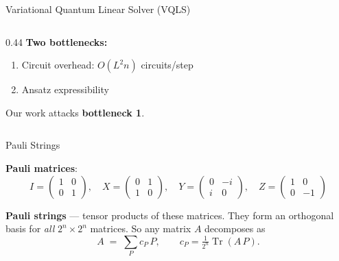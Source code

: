 \documentclass{beamer}
\begin{document}
\begin{frame}{Variational Quantum Linear Solver (VQLS)}
\begin{columns}
\begin{column}{0.44\textwidth}
      \vspace{4pt}
      \textbf{Two bottlenecks:}
      \begin{enumerate}
        \item Circuit overhead: $O(L^2 n)$ circuits/step
        \item Ansatz expressibility
      \end{enumerate}
      \smallskip
      Our work attacks \textbf{bottleneck 1}.
    \end{column}
  \end{columns}
\end{frame}

\begin{frame}{Pauli Strings}

  \textbf{Pauli matrices}:
  \[
    I = \begin{pmatrix}1&0\\0&1\end{pmatrix},\quad
    X = \begin{pmatrix}0&1\\1&0\end{pmatrix},\quad
    Y = \begin{pmatrix}0&-i\\i&0\end{pmatrix},\quad
    Z = \begin{pmatrix}1&0\\0&-1\end{pmatrix}
  \]

  \textbf{Pauli strings} — tensor products of these matrices. They form an orthogonal basis for
  \emph{all} $2^n\times 2^n$ matrices. So any matrix $A$ decomposes as
  \[
    A \;=\; \sum_{P} c_P\, P, \qquad c_P = \tfrac{1}{2^n}\operatorname{Tr}(A\,P).
  \]

\end{frame}
\end{document}
